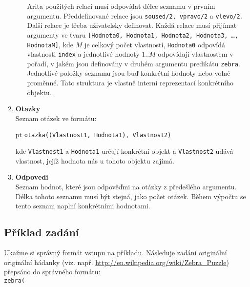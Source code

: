\documentclass[11pt]{article} %
\begin{document}
\begin{enumerate}
\begin{enumerate}
Arita použitých relací musí odpovídat délce seznamu v prvním argumentu. Před\-de\-finované relace jsou \texttt{soused/2, vpravo/2} a \texttt{vlevo/2.} Další relace je třeba uživatelsky definovat. Každá relace musí přijímat argumenty ve tvaru \texttt{[Hodnota0, Hodnota1, Hodnota2, Hodnota3, \ldots, HodnotaM]}, kde $M$ je celkový počet vlastností, \texttt{Hodnota0} odpovídá vlastnosti \texttt{index} a jednotlivé hodnoty $1 .. M$ odpovídají vlastnostem v pořadí, v jakém jsou definovány v druhém argumentu predikátu \texttt{zebra}. Jednotlivé položky seznamu jsou buď konkrétní hodnoty nebo volné proměnné. Tato struktura je vlastně interní reprezentací konkrétního objektu.
\end{enumerate}
\item \textbf{Otazky} \\
Seznam otázek ve formátu:

 pt \texttt{otazka((Vlastnost1, Hodnota1), Vlastnost2)}

kde \texttt{Vlastnost1} a \texttt{Hodnota1} určují konkrétní objekt a \texttt{Vlastnost2} udává vlastnost, jejíž hodnota nás u tohoto objektu zajímá.
\item \textbf{Odpovedi}\\
Seznam hodnot, které jsou odpověďmi na otázky z předešlého argumentu. Délka tohoto seznamu musí být stejná, jako počet otázek. Během výpočtu se tento seznam naplní konkrétními hodnotami.
\end{enumerate}

\subsection{Příklad zadání}
Ukažme si správný formát vstupu na příkladu. Následuje zadání originální originální hádanky (viz. např. \url{http://en.wikipedia.org/wiki/Zebra_Puzzle}) přepsáno do správného formátu: \\

\texttt{zebra(} 
\begingroup
\end{document}
